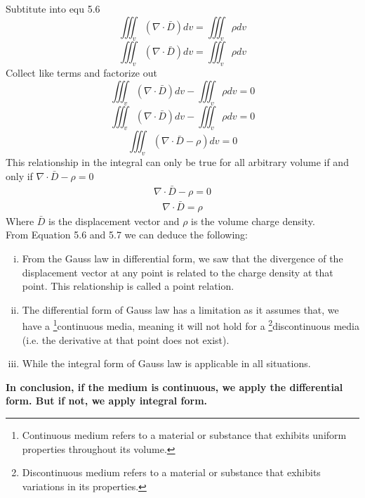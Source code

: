 Subtitute into equ 5.6
\begin{equation*}
\iiint_v(\nabla\cdot \bar{D})dv = \iiint_v\rho dv
\end{equation*}
\begin{equation*}
\iiint_v(\nabla\cdot \bar{D})dv = \iiint_v\rho dv
\end{equation*}
Collect like terms and factorize out
\begin{equation*}
\iiint_v(\nabla\cdot \bar{D})dv - \iiint_v\rho dv = 0
\end{equation*}
\begin{equation*}
\iiint_v(\nabla\cdot \bar{D})dv - \iiint_v\rho dv = 0
\end{equation*}
\begin{equation*}
\iiint_v(\nabla\cdot \bar{D} - \rho)dv = 0
\end{equation*}
This relationship in the integral can only be
true for all arbitrary volume if and only if $\nabla\cdot\bar{D} - \rho = 0$
\begin{align*}
\nabla \cdot \bar{D} - \rho = 0
\end{align*}
\begin{align}
\boxed{\nabla \cdot \bar{D} = \rho}
\end{align}
Where $\bar{D}$ is the displacement vector and $\rho$ is the volume charge density.\\
From Equation 5.6 and 5.7 we can deduce the following:
\begin{enumerate}[(i)]
\item From the Gauss law in differential form, we saw that the divergence of the displacement vector at any point is related to the charge density at that point. This relationship is called a point relation.
\item The differential form of Gauss law has a limitation as it assumes that, we have a \footnote[7]{ Continuous medium refers to a material or substance that exhibits uniform properties throughout its volume.}continuous media, meaning it will not hold for a \footnote[8]{Discontinuous medium refers to a material or substance that exhibits variations in its properties.}discontinuous media (i.e. the derivative at that point does not exist).
\item While the integral form of Gauss law is applicable in all situations.
\end{enumerate}
\textbf{In conclusion, if the medium is continuous, we apply the differential form. But if not, we apply integral form.}

